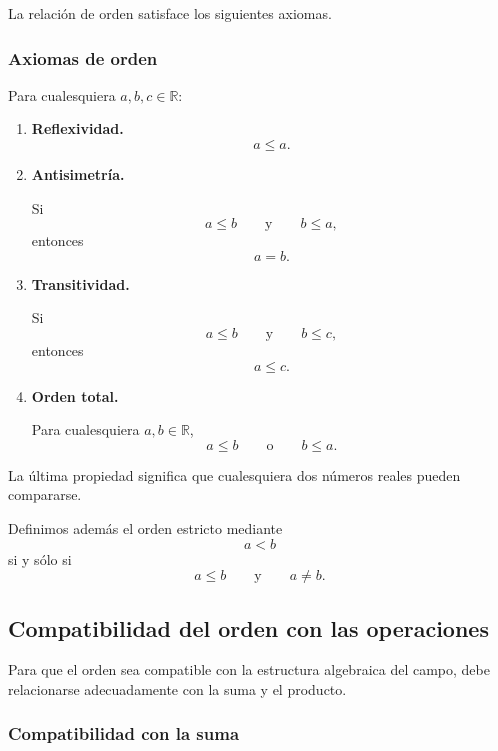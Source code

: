 \documentclass[12pt]{article}
\begin{document}
La relación de orden satisface los siguientes axiomas.

\subsubsection*{Axiomas de orden}

Para cualesquiera $a,b,c\in\mathbb{R}$:

\begin{enumerate}[label=\textbf{O\arabic*.}]

    \item \textbf{Reflexividad.}
    \[
    a\leq a.
    \]

    \item \textbf{Antisimetría.}

    Si
    \[
    a\leq b
    \qquad\text{y}\qquad
    b\leq a,
    \]
    entonces
    \[
    a=b.
    \]

    \item \textbf{Transitividad.}

    Si
    \[
    a\leq b
    \qquad\text{y}\qquad
    b\leq c,
    \]
    entonces
    \[
    a\leq c.
    \]

    \item \textbf{Orden total.}

    Para cualesquiera $a,b\in\mathbb{R}$,
    \[
    a\leq b
    \qquad\text{o}\qquad
    b\leq a.
    \]

\end{enumerate}

La última propiedad significa que cualesquiera dos números reales pueden
compararse.

Definimos además el orden estricto mediante
\[
a<b
\]
si y sólo si
\[
a\leq b
\qquad\text{y}\qquad
a\neq b.
\]

\subsection*{Compatibilidad del orden con las operaciones}

Para que el orden sea compatible con la estructura algebraica del campo,
debe relacionarse adecuadamente con la suma y el producto.

\subsubsection*{Compatibilidad con la suma}
\end{document}
